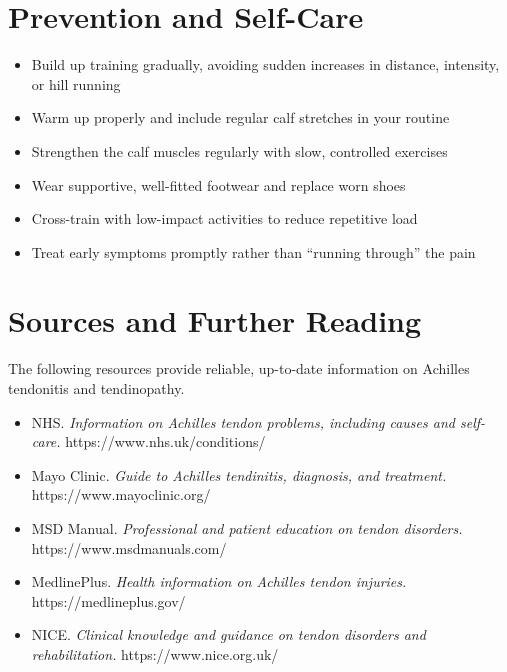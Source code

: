\section*{Prevention and Self-Care}
\begin{itemize}
    \item Build up training gradually, avoiding sudden increases in distance, intensity, or hill running
    \item Warm up properly and include regular calf stretches in your routine
    \item Strengthen the calf muscles regularly with slow, controlled exercises
    \item Wear supportive, well-fitted footwear and replace worn shoes
    \item Cross-train with low-impact activities to reduce repetitive load
    \item Treat early symptoms promptly rather than ``running through'' the pain
\end{itemize}

\section*{Sources and Further Reading}
The following resources provide reliable, up-to-date information on Achilles tendonitis and tendinopathy.

\begin{itemize}
    \item NHS. \textit{Information on Achilles tendon problems, including causes and self-care.} https://www.nhs.uk/conditions/
    \item Mayo Clinic. \textit{Guide to Achilles tendinitis, diagnosis, and treatment.} https://www.mayoclinic.org/
    \item MSD Manual. \textit{Professional and patient education on tendon disorders.} https://www.msdmanuals.com/
    \item MedlinePlus. \textit{Health information on Achilles tendon injuries.} https://medlineplus.gov/
    \item NICE. \textit{Clinical knowledge and guidance on tendon disorders and rehabilitation.} https://www.nice.org.uk/
\end{itemize}
